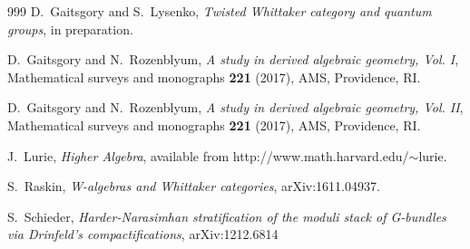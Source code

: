 \documentclass[9pt]{amsart}
\theoremstyle{definition}
\theoremstyle{remark}
\numberwithin{equation}{section}
\begin{document}
\begin{thebibliography}{999}
 D.~Gaitsgory and S.~Lysenko, {\it Twisted Whittaker category and quantum groups}, in preparation. 

 D.~Gaitsgory and N.~Rozenblyum, {\it A study in derived algebraic geometry, Vol. I},  
Mathematical surveys and monographs {\bf 221} (2017), AMS, Providence, RI. 

 D.~Gaitsgory and N.~Rozenblyum, {\it A study in derived algebraic geometry, Vol. II},  
Mathematical surveys and monographs {\bf 221} (2017), AMS, Providence, RI. 

 J.~Lurie, {\it Higher Algebra}, available from http://www.math.harvard.edu/$\sim$lurie. 

 S.~Raskin, {\it W-algebras and Whittaker categories}, arXiv:1611.04937.

 S.~Schieder, {\it Harder-Narasimhan stratification of the moduli stack of G-bundles via Drinfeld's compactifications}, 
arXiv:1212.6814 

\end{thebibliography} 
\end{document}
